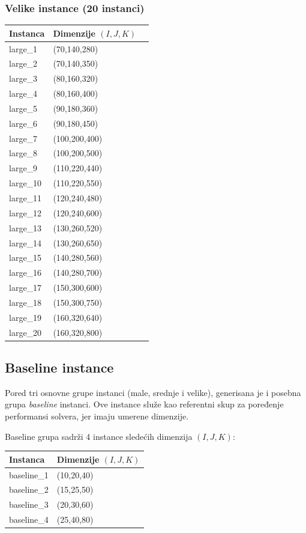 \documentclass[12pt,a4paper]{article}
\begin{document}
\subsubsection*{Velike instance (20 instanci)}
\begin{center}
\begin{tabular}{lll}
\toprule
\textbf{Instanca} & \textbf{Dimenzije} $(I,J,K)$ \\
\midrule
large\_1  & (70,140,280) \\
large\_2  & (70,140,350) \\
large\_3  & (80,160,320) \\
large\_4  & (80,160,400) \\
large\_5  & (90,180,360) \\
large\_6  & (90,180,450) \\
large\_7  & (100,200,400) \\
large\_8  & (100,200,500) \\
large\_9  & (110,220,440) \\
large\_10 & (110,220,550) \\
large\_11 & (120,240,480) \\
large\_12 & (120,240,600) \\
large\_13 & (130,260,520) \\
large\_14 & (130,260,650) \\
large\_15 & (140,280,560) \\
large\_16 & (140,280,700) \\
large\_17 & (150,300,600) \\
large\_18 & (150,300,750) \\
large\_19 & (160,320,640) \\
large\_20 & (160,320,800) \\
\bottomrule
\end{tabular}
\end{center}

\subsection{Baseline instance}
Pored tri osnovne grupe instanci (male, srednje i velike), generisana je i posebna grupa \textit{baseline} instanci.
Ove instance služe kao referentni skup za poređenje performansi solvera, jer imaju umerene dimenzije.

Baseline grupa sadrži 4 instance sledećih dimenzija $(I,J,K)$:

\begin{center}
\begin{tabular}{ll}
\toprule
\textbf{Instanca} & \textbf{Dimenzije} $(I,J,K)$ \\
\midrule
baseline\_1 & (10,20,40) \\
baseline\_2 & (15,25,50) \\
baseline\_3 & (20,30,60) \\
baseline\_4 & (25,40,80) \\
\bottomrule
\end{tabular}
\end{center}
\end{document}
